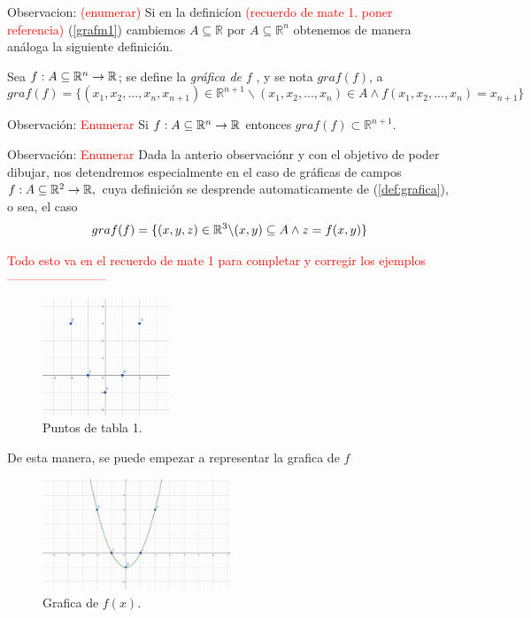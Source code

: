 
Observacion: \textcolor{red}{(enumerar)} Si en la definic\'ion \textcolor{red}{(recuerdo de mate 1. poner referencia)} (\ref{grafm1}) cambiemos  $A \subseteq \mathbb{R}$ por $A \subseteq \mathbb{R}^{n}$  obtenemos de manera an\'aloga la siguiente definici\'on.    




\begin{definition}  \label{def:grafica}
 
 Sea $f: A\subseteq\mathbb{R}^n\rightarrow\mathbb{R}$; se define la \textit{gráfica de $f$ }, y se nota $graf(f)$,  a
 \[
graf(f)=\{(x_1,x_2,...,x_n,x_{n+1})\in \mathbb{R}^{n+1} \backslash (x_1,x_2,...,x_n) \in A \land f(x_1,x_2,...,x_n)=x_{n+1} \}
 \]


Observaci\'on: \textcolor{red}{Enumerar}   Si $f: A\subseteq\mathbb{R}^n\rightarrow\mathbb{R}$ entonces $graf(f) \subset \mathbb{R}^{n+1}.$
 

Observaci\'on: \textcolor{red}{Enumerar} Dada la  anterio observaci\'onr y con el objetivo de poder dibujar,  nos detendremos especialmente en el caso de gr\'aficas de  campos  $f: A\subseteq\mathbb{R}^2\rightarrow\mathbb{R},$ cuya definici\'on se desprende automaticamente  de  (\ref{def:grafica}), o sea, el caso
 \[
graf(f)=\{(x,y,z)\in\mathbb{R}^3 \backslash (x,y)\subseteq A \land z=f(x,y) \}
 \]



\textcolor{red}{Todo esto va en el recuerdo de mate 1 para completar y corregir los ejemplos------------------------}
\begin{figure}[h!] %
    \centering
    \includegraphics[width=0.34\textwidth]{../figs/Puntos_grafica.png} %
    \caption{Puntos de tabla 1.}
    \label{fig:ejemplo1} %
\end{figure}


De esta manera, se puede empezar a representar la grafica de $f$
\begin{figure}[h!] %
    \centering
    \includegraphics[width=0.5\textwidth]{../figs/r2_grafica.png} %
    \caption{Grafica de $f(x)$.}
    \label{fig:ejemplo2} %
\end{figure}
\end{definition}

